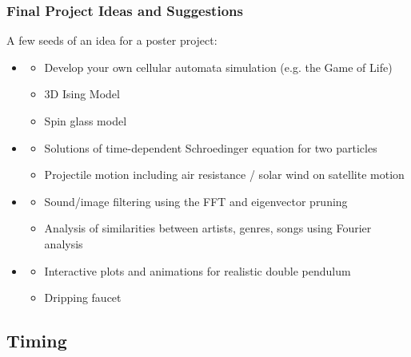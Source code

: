 \documentclass[hyperref={colorlinks=true}]{beamer}
\begin{document}

\begin{frame}%
  \frametitle{Final Project Ideas and Suggestions}

  A few seeds of an idea for a poster project:

    \begin{itemize}
      \item {}
      \begin{itemize}
        \item Develop your own cellular automata simulation (e.g. the Game of Life)
        \item 3D Ising Model
        \item Spin glass model
      \end{itemize}
      \item {}
      \begin{itemize}
        \item Solutions of time-dependent Schroedinger equation for two particles
        \item Projectile motion including air resistance / solar wind on satellite motion
      \end{itemize}
      \item {}
      \begin{itemize}
        \item Sound/image filtering using the FFT and eigenvector pruning
        \item Analysis of similarities between artists, genres, songs using Fourier analysis
      \end{itemize}
      \item {}
      \begin{itemize}
        \item Interactive plots and animations for realistic double pendulum
        \item Dripping faucet
      \end{itemize}
    \end{itemize}

  
\end{frame}

\subsection[Timing]{Timing}
\end{document}

